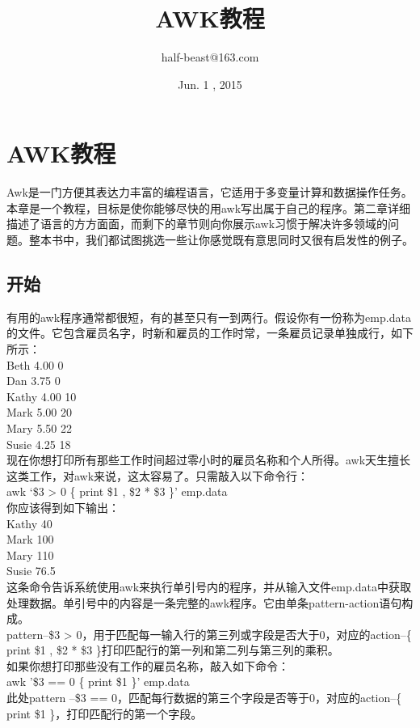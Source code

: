 \documentclass[10pt,fancyhdr,UTF-8]{ctexart}
\title{AWK教程}
\author{half-beast@163.com}
\date{Jun. 1 , 2015}
\begin{document}
\maketitle
\section{AWK教程}
\indent Awk是一门方便其表达力丰富的编程语言，它适用于多变量计算和数据操作任务。本章是一个教程，目标是使你能够尽快的用awk写出属于自己的程序。第二章详细描述了语言的方方面面，而剩下的章节则向你展示awk习惯于解决许多领域的问题。整本书中，我们都试图挑选一些让你感觉既有意思同时又很有启发性的例子。\par
\subsection{开始}
\indent 有用的awk程序通常都很短，有的甚至只有一到两行。假设你有一份称为emp.data的文件。它包含雇员名字，时新和雇员的工作时常，一条雇员记录单独成行，如下所示：\\
\indent Beth 4.00 0\\
\indent Dan  3.75 0\\
\indent Kathy 4.00 10\\
\indent Mark 5.00 20\\
\indent Mary 5.50 22\\
\indent Susie 4.25 18\\
现在你想打印所有那些工作时间超过零小时的雇员名称和个人所得。awk天生擅长这类工作，对awk来说，这太容易了。只需敲入以下命令行：\\
awk `\$3 > 0 \{ print \$1 , \$2  *  \$3  \}' emp.data \\
你应该得到如下输出：\\
\indent Kathy   40\\
\indent Mark    100\\
\indent Mary    110\\
\indent Susie   76.5\\
\indent 这条命令告诉系统使用awk来执行单引号内的程序，并从输入文件emp.data中获取处理数据。单引号中的内容是一条完整的awk程序。它由单条pattern-action语句构成。\\
pattern--\$3 > 0，用于匹配每一输入行的第三列或字段是否大于0，对应的action--\{ print \$1 , \$2 * \$3  \}打印匹配行的第一列和第二列与第三列的乘积。\\
如果你想打印那些没有工作的雇员名称，敲入如下命令：\\
awk '\$3 == 0 \{ print \$1  \}'  emp.data \\
此处pattern --\$3 == 0，匹配每行数据的第三个字段是否等于0，对应的action--\{ print \$1  \}，打印匹配行的第一个字段。\\
\end{document}
